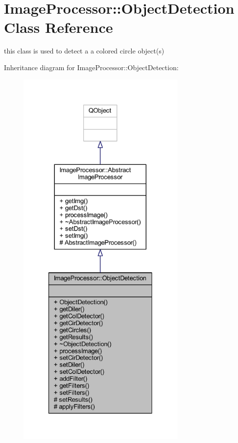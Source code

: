\hypertarget{class_image_processor_1_1_object_detection}{}\section{Image\+Processor\+:\+:Object\+Detection Class Reference}
\label{class_image_processor_1_1_object_detection}


this class is used to detect a a colored circle object(s)  




Inheritance diagram for Image\+Processor\+:\+:Object\+Detection\+:\nopagebreak
\begin{figure}[H]
\begin{center}
\leavevmode
\includegraphics[height=550pt]{da/d04/class_image_processor_1_1_object_detection__inherit__graph}
\end{center}
\end{figure}


